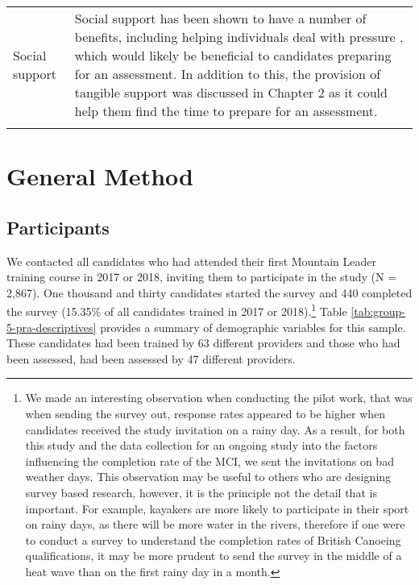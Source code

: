 \documentclass[
  12pt,
  a4paper,
]{book}
\begin{document}
\begin{landscape}
\begin{longtable}[t]{>{\raggedright\arraybackslash}p{3cm}>{\raggedright\arraybackslash}p{21cm}}
Social support & Social support has been shown to have a number of benefits, including helping individuals deal with pressure \citep{Freeman2011, Freeman2014}, which would likely be beneficial to candidates preparing for an assessment. In addition to this, the provision of tangible support was discussed in Chapter 2 as it could help them find the time to prepare for an assessment.\\*
\end{longtable}
\end{landscape}

\hypertarget{pra-general-method}{%
\section{General Method}\label{pra-general-method}}

\hypertarget{pra-participants}{%
\subsection{Participants}\label{pra-participants}}

We contacted all candidates who had attended their first Mountain Leader training course in 2017 or 2018, inviting them to participate in the study (N = 2,867). One thousand and thirty candidates started the survey and 440 completed the survey (15.35\% of all candidates trained in 2017 or 2018).\footnote{We made an interesting observation when conducting the pilot work, that was when sending the survey out, response rates appeared to be higher when candidates received the study invitation on a rainy day. As a result, for both this study and the data collection for an ongoing study into the factors influencing the completion rate of the MCI, we sent the invitations on bad weather days. This observation may be useful to others who are designing survey based research, however, it is the principle not the detail that is important. For example, kayakers are more likely to participate in their sport on rainy days, as there will be more water in the rivers, therefore if one were to conduct a survey to understand the completion rates of British Canoeing qualifications, it may be more prudent to send the survey in the middle of a heat wave than on the first rainy day in a month.} Table \ref{tab:group-5-pra-descriptives} provides a summary of demographic variables for this sample. These candidates had been trained by 63 different providers and those who had been assessed, had been assessed by 47 different providers.
\end{document}
